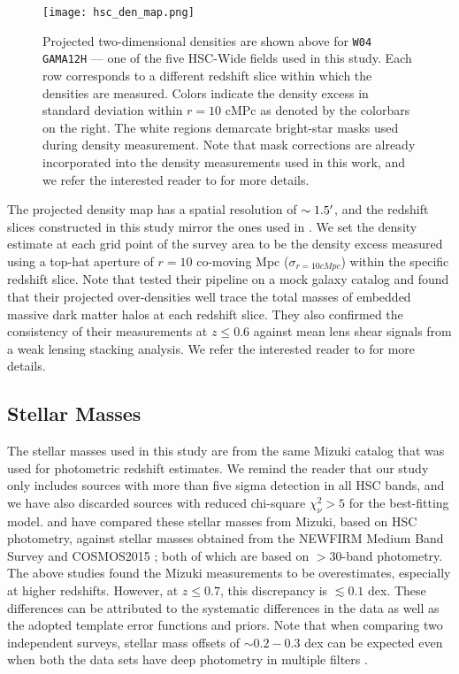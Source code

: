 \begin{figure}[htb]
    \centering
    \texttt{[image: hsc\_den\_map.png]}
    \caption{Projected two-dimensional densities are shown above for \texttt{W04 GAMA12H} --- one of the five HSC-Wide fields used in this study. Each row corresponds to a different redshift slice within which the densities are measured. Colors indicate the density excess in standard deviation within $r=10$ cMPc as denoted by the colorbars on the right. The white regions demarcate bright-star masks used during density measurement. Note that mask corrections are already incorporated into the density measurements used in this work, and we refer the interested reader to \citet{hsc_den} for more details.}
    \label{fig_c4:hsc_den_map}
\end{figure} 

The projected density map has a spatial resolution of $\sim1.5\mbox{$^\prime$}$, and the redshift slices constructed in this study mirror the ones used in \citet{hsc_den}. We set the density estimate at each grid point of the survey area to be the density excess measured using a top-hat aperture of $r=10$ co-moving Mpc ($\sigma_{r=10 cMpc}$) within the specific redshift slice. Note that \citet{hsc_den} tested their pipeline on a mock galaxy catalog and found that their projected over-densities well trace the total masses of embedded massive dark matter halos at each redshift slice. They also confirmed the consistency of their measurements at $z \leq 0.6$ against mean lens shear signals from a weak lensing stacking analysis. We refer the interested reader to \citet{hsc_den} for more details. 

\subsection{Stellar Masses} \label{sec_c4:mass_completeness}
The stellar masses used in this study are from the same Mizuki catalog that was used for photometric redshift estimates. We remind the reader that our study only includes sources with more than five sigma detection in all HSC bands, and we have also discarded sources with reduced chi-square $\chi_{\nu}^2 > 5$ for the best-fitting model. \citet{hsc_photoz_pdr1} and \citet{hsc_morph_den} have compared these stellar masses from Mizuki, based on HSC \gb{}\rb\ib\zb\yb{} photometry, against stellar masses obtained from the NEWFIRM Medium Band Survey \citep{newfirm} and COSMOS2015 \citep{cosmos_2015}; both of which are based on $>30$-band photometry. The above studies found the Mizuki measurements to be overestimates, especially at higher redshifts. However, at $z \leq 0.7$, this discrepancy is $\lesssim0.1$ dex. These differences can be attributed to the systematic differences in the data as well as the adopted template error functions and priors. Note that when comparing two independent surveys, stellar mass offsets of $\sim0.2-0.3$ dex can be expected even when both the data sets have deep photometry in multiple filters \citep[e.g.,][]{dokkum_14}.

